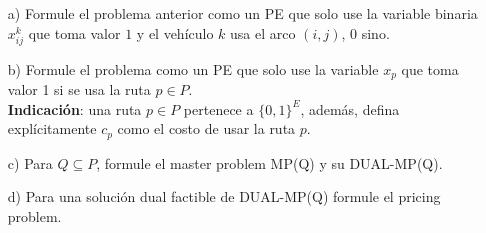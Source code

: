 \documentclass[10pt]{article}
\theoremstyle{plain}
\theoremstyle{definition}
\begin{document}
\begin{itemize}
\item[a)] Formule el problema anterior como un PE que solo use la variable binaria $x_{ij}^{k}$ que toma valor $1$ y el vehículo $k$ usa el arco $(i,j)$, 0 sino.

\item[b)] Formule el problema como un PE que solo use la variable $x_{p}$ que toma valor 1 si se usa la ruta $p\in P$.\\ \textbf{Indicación}: una ruta $p\in P$ pertenece a $\{0,1\}^{E}$, además, defina explícitamente $c_{p}$ como el costo de usar la ruta $p$.

\item[c)] Para $Q\subseteq P$, formule el master problem MP(Q) y su DUAL-MP(Q).
\item[d)] Para una solución dual factible de DUAL-MP(Q) formule el pricing problem.

\end{itemize}
\end{document}
